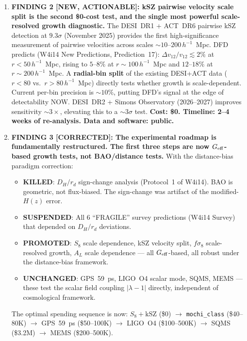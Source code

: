 \documentclass[11pt]{article}
\newcommand{\Geff}{G_{\rm eff}}
\begin{document}
\begin{tcolorbox}[colback=blue!5!white, colframe=blue!60!black,
  title=\textbf{W4i15 TOP 5 FINDINGS --- Ranked by Programme Impact}]
\begin{enumerate}
\item \textbf{FINDING 2 [NEW, ACTIONABLE]: kSZ pairwise velocity scale
split is the second \$0-cost test, and the single most powerful
scale-resolved growth diagnostic.}
The DESI~DR1 + ACT~DR6 pairwise kSZ detection at $9.3\sigma$
(November 2025) provides the first high-significance measurement of
pairwise velocities across scales $\sim 10$--$200\,h^{-1}$~Mpc.
DFD predicts (W4i14 New Predictions, Prediction~17):
$\Delta v_{12}/v_{12} \lesssim 2\%$ at $r < 50\,h^{-1}$~Mpc,
rising to $5$--$8\%$ at $r \sim 100\,h^{-1}$~Mpc and
$12$--$18\%$ at $r \sim 200\,h^{-1}$~Mpc.
A \textbf{radial-bin split} of the existing DESI+ACT data
($r < 80$ vs.\ $r > 80\,h^{-1}$~Mpc) directly tests whether
growth is scale-dependent. Current per-bin precision is $\sim 10\%$,
putting DFD's signal at the edge of detectability NOW.
DESI~DR2 + Simons Observatory (2026--2027) improves sensitivity
$\sim 3\times$, elevating this to a $\sim 3\sigma$ test.
\textbf{Cost: \$0. Timeline: 2--4 weeks of re-analysis.
Data and software: public.}

\item \textbf{FINDING 3 [CORRECTED]: The experimental roadmap is
fundamentally restructured.  The first three steps are now
$G_{\rm eff}$-based growth tests, not BAO/distance tests.}
With the distance-bias paradigm correction:
\begin{itemize}[nosep]
\item \textbf{KILLED}: $D_H/r_d$ sign-change analysis (Protocol~1
  of W4i14). BAO is geometric, not flux-biased. The sign-change was
  artifact of the modified-$H(z)$ error.
\item \textbf{SUSPENDED}: All 6 ``FRAGILE'' survey predictions
  (W4i14 Survey) that depended on $D_H/r_d$ deviations.
\item \textbf{PROMOTED}: $S_8$ scale dependence, kSZ velocity split,
  $f\sigma_8$ scale-resolved growth, $A_L$ scale dependence ---
  all $\Geff$-based, all robust under the distance-bias framework.
\item \textbf{UNCHANGED}: GPS~59~ps, LIGO~O4 scalar mode, SQMS, MEMS
  --- these test the scalar field coupling $|\lambda - 1|$ directly,
  independent of cosmological framework.
\end{itemize}
The optimal spending sequence is now:
$S_8 + \text{kSZ}$ (\$0) $\to$ \texttt{mochi\_class} (\$40--80K) $\to$
GPS~59~ps (\$50--100K) $\to$ LIGO~O4 (\$100--500K) $\to$
SQMS (\$3.2M) $\to$ MEMS (\$200--500K).


\end{enumerate}
\end{tcolorbox}
\end{document}
